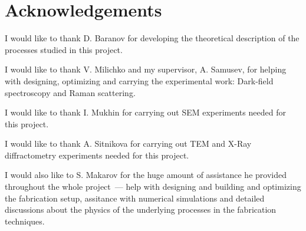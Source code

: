 \section*{Acknowledgements}

        I would like to thank D. Baranov for developing the theoretical description of the processes studied in this project.

        I would like to thank V. Milichko and my supervisor, A. Samusev, for helping with designing, optimizing and carrying the experimental work:
    Dark-field spectroscopy and Raman scattering.

        I would like to thank I. Mukhin for carrying out SEM experiments needed for this project.

        I would like to thank A. Sitnikova for carrying out TEM and X-Ray diffractometry experiments needed for this project.

        I would also like to S. Makarov for the huge amount of assistance he provided throughout the whole project~--- help with
    designing and building and optimizing the fabrication setup, assitance with numerical simulations and detailed discussions about the
    physics of the underlying processes in the fabrication techniques.


\clearpage
